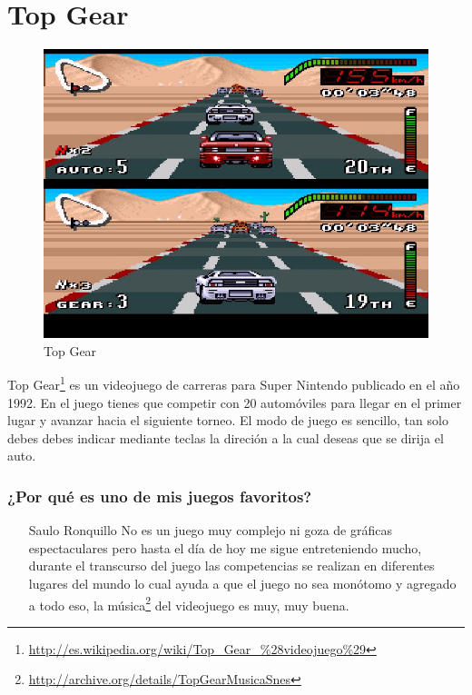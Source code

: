 \section{Top Gear}

\begin{figure}[htbp]
\begin{center}
\includegraphics[width=.60\textwidth]{./imagenes/top_gear.jpg}
\caption{Top Gear}
\label{Top Gear}
\end{center}
\end{figure}
Top Gear\footnote{\url{http://es.wikipedia.org/wiki/Top_Gear_%28videojuego%29}} es un videojuego de carreras para Super Nintendo publicado en el año 1992. En el juego tienes que competir con 20 automóviles para llegar en el primer lugar y avanzar hacia el siguiente torneo. El modo de juego es sencillo, tan solo debes debes indicar mediante teclas la direción a la cual deseas que se dirija el auto.

\subsubsection{¿Por qué es uno de mis juegos favoritos?}
\begin{itemize}
\item[Saulo Ronquillo]No es un juego muy complejo ni goza de gráficas espectaculares pero hasta el día de hoy me sigue entreteniendo mucho, durante el transcurso del juego las competencias se realizan en diferentes lugares del mundo lo cual ayuda a que el juego no sea monótomo y agregado a todo eso, la música\footnote{\url{http://archive.org/details/TopGearMusicaSnes}} del videojuego es muy, muy buena.
\end{itemize}
